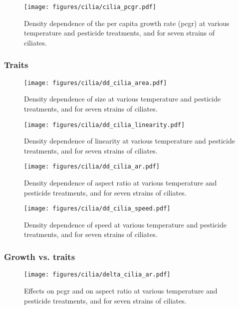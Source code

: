 \begin{figure}[hbt!]
    \centering
    \texttt{[image: figures/cilia/cilia\_pcgr.pdf]}
    \caption{Density dependence of the per capita growth rate (pcgr) at various temperature and pesticide treatments, and for seven strains of ciliates.}
    \label{fig:dd_cilia}
\end{figure}

\clearpage

\subsubsection{Traits}

\begin{figure}[hbt!]
    \centering
    \texttt{[image: figures/cilia/dd\_cilia\_area.pdf]}
    \caption{Density dependence of size at various temperature and pesticide treatments, and for seven strains of ciliates.}
    \label{fig:dd_cilia_area}
\end{figure}

\begin{figure}[hbt!]
    \centering
    \texttt{[image: figures/cilia/dd\_cilia\_linearity.pdf]}
    \caption{Density dependence of linearity at various temperature and pesticide treatments, and for seven strains of ciliates.}
    \label{fig:dd_cilia_linearity}
\end{figure}

\begin{figure}[hbt!]
    \centering
    \texttt{[image: figures/cilia/dd\_cilia\_ar.pdf]}
    \caption{Density dependence of aspect ratio at various temperature and pesticide treatments, and for seven strains of ciliates.}
    \label{fig:dd_cilia_ar}
\end{figure}

\begin{figure}[hbt!]
    \centering
    \texttt{[image: figures/cilia/dd\_cilia\_speed.pdf]}
    \caption{Density dependence of speed at various temperature and pesticide treatments, and for seven strains of ciliates.}
    \label{fig:dd_cilia_speed}
\end{figure}

\clearpage

\subsubsection{Growth vs. traits}

\begin{figure}[hbt!]
    \centering
    \texttt{[image: figures/cilia/delta\_cilia\_ar.pdf]}
    \caption{Effects on pcgr and on aspect ratio at various temperature and pesticide treatments, and for seven strains of ciliates.}
    \label{fig:delta_cilia_ar}
\end{figure}

